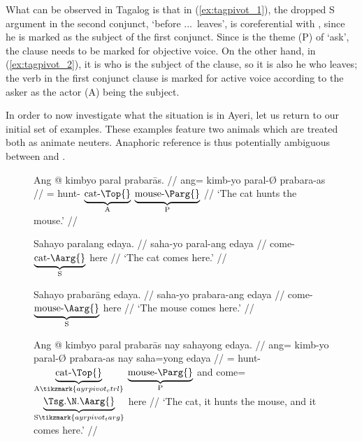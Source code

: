 What can be observed in Tagalog is that in (\ref{ex:tagpivot_1}), the dropped S
argument in the second conjunct,  `before ...\ leaves', is
coreferential with , since he is marked as the subject of the first
conjunct. Since  is the theme (P) of  `ask', the clause
needs to be marked for objective voice. On the other hand, in
(\ref{ex:tagpivot_2}), it is  who is the subject of the clause, so it
is also he who leaves; the verb in the first conjunct clause is marked for
active voice according to the asker as the actor (A) being the subject.

In order to now investigate what the situation is in Ayeri, let us return to
our initial set of examples. These examples feature two animals which are
treated both as animate neuters. Anaphoric reference is thus potentially
ambiguous between  and .

\begin{figure}
\pex\label{ex:ayrpivot}%
\a\label{ex:ayrpivot_1}
	\begingl
		\gla Ang @ kimbyo paral prabarās. //
		\glb ang= kimb-yo paral-Ø prabara-as //
		\glc \AgtT{}= hunt-\TsgN{}
			$\underbrace{\text{cat-\Top{}}}_{\text{A}}$
			$\underbrace{\text{mouse-\Parg{}}}_{\text{P}}$ //
		\glft `The cat hunts the mouse.' //
	\endgl
	
\a\label{ex:ayrpivot_2}%
	\begingl
		\gla Sahayo paralang edaya. //
		\glb saha-yo paral-ang edaya //
		\glc come-\TsgN{} $\underbrace{\text{cat-\Aarg{}}}_{\text{S}}$
			here //
		\glft `The cat comes here.' //
	\endgl
	
\a\label{ex:ayrpivot_3}%
	\begingl
		\gla Sahayo prabarāng edaya. //
		\glb saha-yo prabara-ang edaya //
		\glc come-\TsgN{} $\underbrace{\text{mouse-\Aarg{}}}_{\text{S}}$
			here //
		\glft `The mouse comes here.' //
	\endgl
	
\a\label{ex:ayrpivot_4}%
	\begingl[aboveglftskip=1em]
		\gla Ang @ kimbyo paral prabarās nay sahayong edaya. //
		\glb ang= kimb-yo paral-Ø prabara-as nay saha=yong edaya  //
		\glc \AgtT{}= hunt-\TsgN{}
			$\underbrace{\text{cat-\Top{}}}_{\text{A}\tikzmark{ayrpivot_ctrl}}$
			$\underbrace{\text{mouse-\Parg{}}}_{\text{P}}$
			and
			come=$\underbrace{\text{\smash{\TsgN{}}.\Aarg{}}}_%
				{\text{S}\tikzmark{ayrpivot_targ}}$
			here //
		\glft `The cat, it hunts the mouse, and it comes here.' //
	\endgl

\xe
\end{figure}

